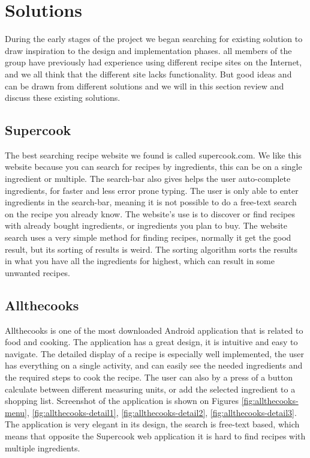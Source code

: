 \section{Solutions}
During the early stages of the project we began searching for existing solution to draw inspiration to the design and implementation phases. all members of the group have previously had experience using different recipe sites on the Internet, and we all think that the different site lacks functionality. But good ideas and can be drawn from different solutions and we will in this section review and discuss these existing solutions.  

\subsection*{Supercook}
The best searching recipe website we found is called supercook.com\cite{supercook}. We like this website because you can search for recipes by ingredients, this can be on a single ingredient or multiple. The search-bar also gives helps the user auto-complete ingredients, for faster and less error prone typing. 
The user is only able to enter ingredients in the search-bar, meaning it is not possible to do a free-text search on the recipe you already know. The website's use is to discover or find recipes with already bought ingredients, or ingredients you plan to buy. The website search uses a very simple method for finding recipes, normally it get the good result, but its sorting of results is weird. The sorting algorithm sorts the results in what you have all the ingredients for highest, which can result in some unwanted recipes. 

\subsection*{Allthecooks}
Allthecooks is one of the most downloaded \cite{allthecooks-googleplay} Android application that is related to food and cooking. The application has a great design, it is intuitive and easy to navigate. The detailed display of a recipe is especially well implemented, the user has everything on a single activity, and can easily see the needed ingredients and the required steps to cook the recipe. The user can also by a press of a button calculate between different measuring units, or add the selected ingredient to a shopping list. Screenshot of the application is shown on Figures \ref{fig:allthecooks-menu}, \ref{fig:allthecooks-detail1}, \ref{fig:allthecooks-detail2}, \ref{fig:allthecooks-detail3}. The application is very elegant in its design, the search is free-text based, which means that opposite the Supercook web application it is hard to find recipes with multiple ingredients.

